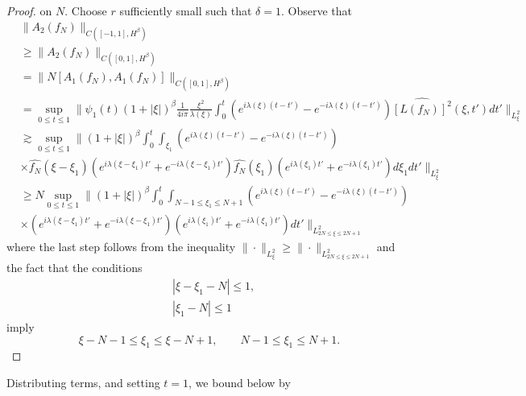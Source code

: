 \documentclass[12pt,reqno]{amsart}
\numberwithin{equation}{section}  %
\newcommand{\wh}{\widehat}
\begin{document}
\begin{proof}
{on $N$}. Choose $r$ sufficiently small such that $\delta =1$.  
Observe that
%
%
\begin{equation}
  \label{pol}
\begin{split}
  & \| A_{2}(f_{N}) \|_{C([-1, 1], H^{\beta})} 
  \\
& \ge \| A_{2}(f_{N}) \|_{C([0, 1], H^{\beta})} 
\\
  &  =  \| N[A_{1}(f_{N}), A_{1}(f_{N})] \|_{C([0, 1],
  H^{\beta})} 
  \\
  & = \sup_{0 \le t \le 1} \| \psi_{1}(t) (1 + | \xi |)^{\beta}
  \frac{1}{4 i \pi} \frac{\xi^{2}}{\lambda(\xi)}
  \int_{0}^{t} \left( e^{i\lambda(\xi)(t-t')} - e^{-i\lambda(\xi)(t-t')} \right)
  \wh{[L(f_{N})]^{2}}(\xi, t') dt' \|_{L^{2}_{\xi}}
  \\
  & \gtrsim \sup_{0 \le t \le 1} \| (1 + | \xi |)^{\beta}
  \int_{0}^{t} \int_{\xi_{1}} \left( e^{i\lambda(\xi)(t-t')} - e^{-i\lambda(\xi)(t-t')} \right)
  \\
  & \times \wh{f_{N}}(\xi - \xi_{1})\left( e^{i\lambda(\xi - \xi_{1})t'} +
  e^{-i\lambda(\xi - \xi_{1})t'} \right)
  \wh{f_{N}}(\xi_{1})\left( e^{i \lambda(\xi_{1})t'} +
  e^{-i \lambda(\xi_{1})t'} \right) 
  d \xi_{1} dt' \|_{L^{2}_{\xi}}
  \\
  & \ge N \sup_{0 \le t \le 1} \| (1 + | \xi |)^{\beta}
  \int_{0}^{t} \int_{N-1 \le \xi_{1} \le N+1} \left( e^{i\lambda(\xi)(t-t')} - e^{-i\lambda(\xi)(t-t')} \right)
  \\
  & \times \left( e^{i\lambda(\xi - \xi_{1})t'} +
  e^{-i\lambda(\xi - \xi_{1})t'} \right)
  \left( e^{i \lambda(\xi_{1})t'} +
  e^{-i \lambda(\xi_{1})t'} \right) 
  dt' \|_{L^{2}_{2N \le \xi \le 2N +1}}
   \end{split}
\end{equation}
%
%
where the last step follows from the inequality $\| \cdot \|_{L^{2}_{\xi}} \ge \| \cdot \|_{L^{2}_{2N \le \xi \le 2N+1}}$ and the fact that 
the conditions
%
%
\begin{equation*}
\begin{split}
  & | \xi - \xi_{1} - N | \le 1,
  \\
  & | \xi_{1} - N | \le 1
\end{split}
\end{equation*}
%
%
imply 
\begin{equation*}
  \xi - N - 1 \le \xi_{1} \le \xi - N +1, \qquad N-1 \le \xi_{1} \le N+1.
\end{equation*}
\end{proof}
%
Distributing terms, and setting $t=1$, we bound below by 
\end{document}
